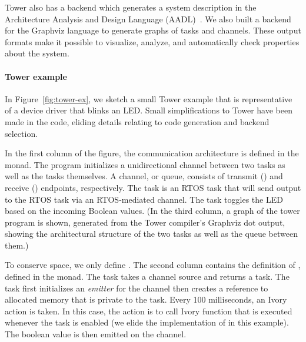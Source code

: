Tower also has a backend which generates a system description in the
Architecture Analysis and Design Language (AADL)~\cite{SAE:AADL}. We also built
a backend for the Graphviz language to generate graphs of tasks and channels.
These output formats make it possible to visualize, analyze, and automatically
check properties about the system.

\paragraph{Tower example}
\label{sec:examples}

In Figure~\ref{fig:tower-ex}, we sketch a small Tower example that is
representative of a device driver that blinks an LED.  Small simplifications to
Tower have been made in the code, eliding details relating to code generation
and backend selection.

In the first column of the figure, the communication
architecture is defined in the  monad.  The program initializes a
unidirectional channel between two tasks as well as the tasks themselves.  A channel, or queue,
consists of transmit () and receive () endpoints, respectively.
The  task is an RTOS task that will send output to the
 RTOS task via an RTOS-mediated channel.  The 
task toggles the LED based on the incoming Boolean values.  (In the third column, a graph of the tower program is shown, generated from the
Tower compiler's Graphviz dot output, showing the architectural structure of the
two tasks as well as the queue between them.)

To conserve space, we only define .  The second column contains
the definition of , defined in the  monad.  The
 task takes a channel source and returns a task.  The
task first initializes an \emph{emitter} for the channel then creates a
reference to allocated memory that is private to the task.  Every 100
milliseconds, an Ivory action is taken.  In this case, the action is to call
Ivory function  that is executed whenever the task is enabled
(we elide the implementation of  in this example).  The
boolean value  is then emitted on the channel.




